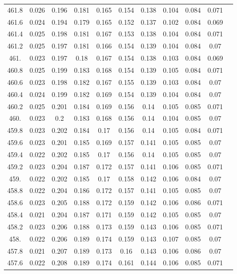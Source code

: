 \documentclass[12pt]{ctexart}
\numberwithin{equation}{section}
\begin{document}
\begin{longtable}{ccccccccccc}
461.8	&	0.026	&	0.196	&	0.181	&	0.165	&	0.154	&	0.138	&	0.104	&	0.084	&	0.071	\\
461.6	&	0.024	&	0.194	&	0.179	&	0.165	&	0.152	&	0.137	&	0.102	&	0.084	&	0.069	\\
461.4	&	0.025	&	0.198	&	0.181	&	0.167	&	0.153	&	0.138	&	0.104	&	0.084	&	0.071	\\
461.2	&	0.025	&	0.197	&	0.181	&	0.166	&	0.154	&	0.139	&	0.104	&	0.084	&	0.07	\\
461.	&	0.023	&	0.197	&	0.18	&	0.167	&	0.154	&	0.138	&	0.103	&	0.084	&	0.069	\\
460.8	&	0.025	&	0.199	&	0.183	&	0.168	&	0.154	&	0.139	&	0.105	&	0.084	&	0.071	\\
460.6	&	0.023	&	0.198	&	0.182	&	0.167	&	0.155	&	0.139	&	0.103	&	0.084	&	0.07	\\
460.4	&	0.024	&	0.199	&	0.182	&	0.169	&	0.154	&	0.139	&	0.104	&	0.084	&	0.07	\\
460.2	&	0.025	&	0.201	&	0.184	&	0.169	&	0.156	&	0.14	&	0.105	&	0.085	&	0.071	\\
460.	&	0.023	&	0.2	&	0.183	&	0.168	&	0.156	&	0.14	&	0.104	&	0.085	&	0.07	\\
459.8	&	0.023	&	0.202	&	0.184	&	0.17	&	0.156	&	0.14	&	0.105	&	0.084	&	0.071	\\
459.6	&	0.023	&	0.201	&	0.185	&	0.169	&	0.157	&	0.141	&	0.105	&	0.085	&	0.07	\\
459.4	&	0.022	&	0.202	&	0.185	&	0.17	&	0.156	&	0.14	&	0.105	&	0.085	&	0.07	\\
459.2	&	0.023	&	0.204	&	0.187	&	0.172	&	0.157	&	0.141	&	0.106	&	0.085	&	0.071	\\
459.	&	0.022	&	0.202	&	0.185	&	0.17	&	0.158	&	0.142	&	0.106	&	0.084	&	0.07	\\
458.8	&	0.022	&	0.204	&	0.186	&	0.172	&	0.157	&	0.141	&	0.105	&	0.085	&	0.07	\\
458.6	&	0.023	&	0.205	&	0.188	&	0.172	&	0.159	&	0.142	&	0.106	&	0.086	&	0.071	\\
458.4	&	0.021	&	0.204	&	0.187	&	0.171	&	0.159	&	0.142	&	0.105	&	0.085	&	0.07	\\
458.2	&	0.023	&	0.206	&	0.188	&	0.173	&	0.159	&	0.143	&	0.106	&	0.085	&	0.071	\\
458.	&	0.022	&	0.206	&	0.189	&	0.174	&	0.159	&	0.143	&	0.107	&	0.085	&	0.07	\\
457.8	&	0.021	&	0.207	&	0.189	&	0.173	&	0.16	&	0.143	&	0.106	&	0.086	&	0.07	\\
457.6	&	0.022	&	0.208	&	0.189	&	0.174	&	0.161	&	0.144	&	0.106	&	0.085	&	0.071	\\

\end{longtable}
\end{document}
